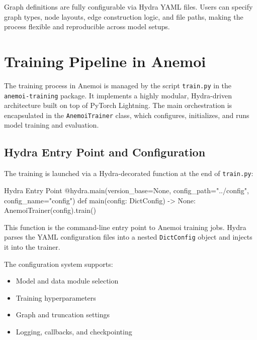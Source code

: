 Graph definitions are fully configurable via Hydra YAML files. Users can specify graph types, node layouts, edge construction logic, and file paths, making the process flexible and reproducible across model setups.


%
\section{Training Pipeline in Anemoi}

The training process in Anemoi is managed by the script \texttt{train.py} in the \texttt{anemoi-training} package. It implements a highly modular, Hydra-driven architecture built on top of PyTorch Lightning. The main orchestration is encapsulated in the \texttt{AnemoiTrainer} class, which configures, initializes, and runs model training and evaluation.

%
\subsection{Hydra Entry Point and Configuration}

The training is launched via a Hydra-decorated function at the end of \texttt{train.py}:

\begin{codeonly}{Hydra Entry Point}
@hydra.main(version_base=None, config_path="../config", config_name="config")
def main(config: DictConfig) -> None:
    AnemoiTrainer(config).train()
\end{codeonly}

This function is the command-line entry point to Anemoi training jobs. Hydra parses the YAML configuration files into a nested \texttt{DictConfig} object and injects it into the trainer.

The configuration system supports:
\begin{itemize}
  \item Model and data module selection
  \item Training hyperparameters
  \item Graph and truncation settings
  \item Logging, callbacks, and checkpointing
\end{itemize}


